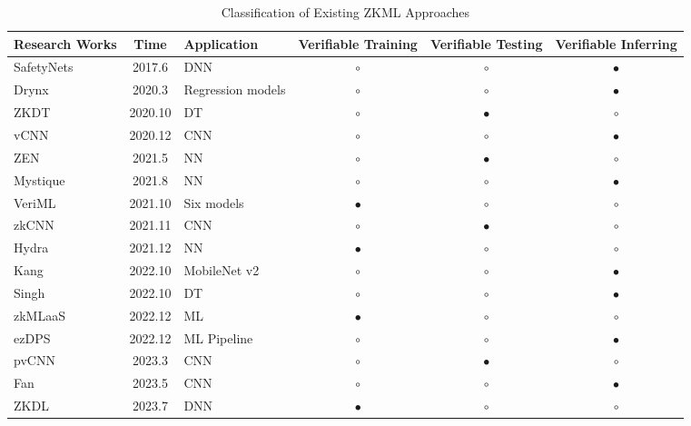 \documentclass[journal]{IEEEtran}
\begin{document}
\begin{table*}[t]
    \caption{Classification of Existing ZKML Approaches}
    \centering
    \begin{tabular}{l c l c c c}
        \hline
        \textbf{Research Works} & \textbf{Time} & \textbf{Application} & \textbf{Verifiable Training} & \textbf{Verifiable Testing} & \textbf{Verifiable Inferring} \\ 
        \hline
        SafetyNets\cite{ghodsi2017safetynets} & 2017.6 & DNN & $\circ$ & $\circ$  & $\bullet$  \\ \hline
        Drynx\cite{froelicher2020drynx} & 2020.3 & Regression models & $\circ$ & $\circ$ & $\bullet$  \\ \hline
        ZKDT\cite{zhang2020zero} & 2020.10 & DT & $\circ$ & $\bullet$ & $\circ$  \\ \hline
        vCNN\cite{lee2024vcnn} & 2020.12 & CNN & $\circ$ & $\circ$ & $\bullet$  \\ \hline
        ZEN\cite{feng2021zen} & 2021.5 & NN &  $\circ$   & $\bullet$  & $\circ$ \\ \hline
        Mystique\cite{weng2021mystique} & 2021.8 & NN & $\circ$ & $\circ$ & $\bullet$  \\ \hline
        VeriML\cite{zhao2021veriml} & 2021.10 & Six models & $\bullet$  & $\circ$ & $\circ$\\ \hline
        zkCNN\cite{liu2021zkcnn} & 2021.11 & CNN & $\circ$ & $\bullet$ & $\circ$  \\ \hline
        Hydra\cite{zhang2021hydra} & 2021.12 & NN & $\bullet$  & $\circ$  & $\circ$ \\ \hline
        Kang\cite{kang2022scaling} & 2022.10 & MobileNet v2 & $\circ$ & $\circ$ & $\bullet$  \\ \hline
        Singh\cite{singh2022zero} & 2022.10 & DT & $\circ$ & $\circ$ & $\bullet$ \\ \hline
        zkMLaaS\cite{huang2022zkmlaas} & 2022.12 & ML & $\bullet$  & $\circ$ & $\circ$  \\ \hline
        ezDPS\cite{wang2022ezdps} & 2022.12 & ML Pipeline & $\circ$ & $\circ$ & $\bullet$ \\ \hline
        pvCNN\cite{weng2023pvcnn} & 2023.3 & CNN & $\circ$  & $\bullet$  & $\circ$  \\ \hline
        Fan\cite{fan2023validating} & 2023.5 & CNN & $\circ$    & $\circ$  & $\bullet$  \\ \hline
        ZKDL\cite{sun2023zkdl} & 2023.7 & DNN & $\bullet$ & $\circ$   &  $\circ$    \\ \hline

\end{tabular}
\end{table*}
\end{document}
